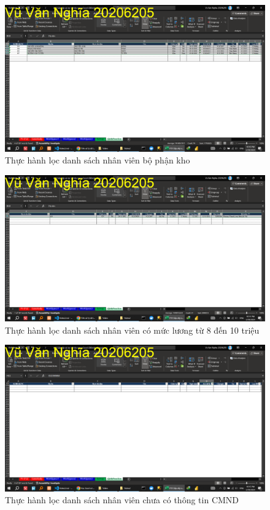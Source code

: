 \documentclass{article}
\begin{document}
\begin{figure}[h]
    \centering
    \includegraphics[scale = 0.15]{Video2/ThucHanh/3.png}
    \caption{Thực hành lọc danh sách nhân viên bộ phận kho}
\end{figure}

\begin{figure}[h]
    \centering
    \includegraphics[scale = 0.15]{Video2/ThucHanh/4.png}
    \caption{Thực hành lọc danh sách nhân viên có mức lương từ 8 đến 10 triệu}
\end{figure}

\begin{figure}[h]
    \centering
    \includegraphics[scale = 0.15]{Video2/ThucHanh/5.png}
    \caption{Thực hành lọc danh sách nhân viên chưa có thông tin CMND}
\end{figure}
\end{document}
